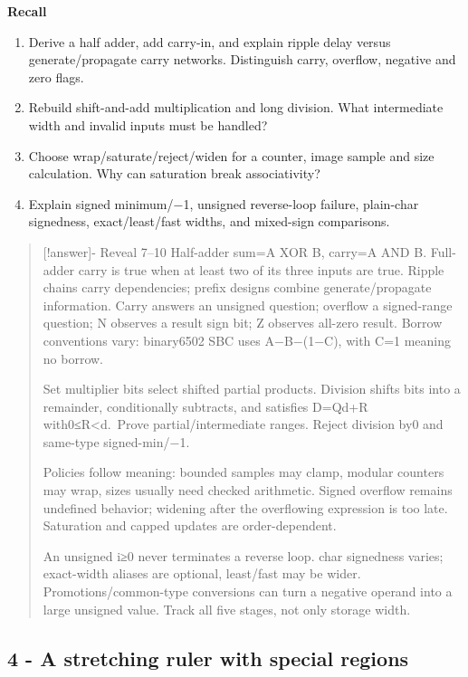 \textbf{Recall}

\begin{enumerate}
\def\labelenumi{\arabic{enumi}.}
\setcounter{enumi}{6}
\tightlist
\item
  Derive a half adder, add carry-in, and explain ripple delay versus generate/propagate carry networks. Distinguish carry, overflow, negative and zero flags.
\item
  Rebuild shift-and-add multiplication and long division. What intermediate width and invalid inputs must be handled?
\item
  Choose wrap/saturate/reject/widen for a counter, image sample and size calculation. Why can saturation break associativity?
\item
  Explain signed minimum/−1, unsigned reverse-loop failure, plain-char signedness, exact/least/fast widths, and mixed-sign comparisons.
\end{enumerate}

\begin{quote}
{[}!answer{]}- Reveal 7--10 Half-adder sum=A XOR B, carry=A AND B. Full-adder carry is true when at least two of its three inputs are true. Ripple chains carry dependencies; prefix designs combine generate/propagate information. Carry answers an unsigned question; overflow a signed-range question; N observes a result sign bit; Z observes all-zero result. Borrow conventions vary: binary6502 SBC uses A−B−(1−C), with C=1 meaning no borrow.

Set multiplier bits select shifted partial products. Division shifts bits into a remainder, conditionally subtracts, and satisfies D=Qd+R with0≤R\textless d.~Prove partial/intermediate ranges. Reject division by0 and same-type signed-min/−1.

Policies follow meaning: bounded samples may clamp, modular counters may wrap, sizes usually need checked arithmetic. Signed overflow remains undefined behavior; widening after the overflowing expression is too late. Saturation and capped updates are order-dependent.

An unsigned i≥0 never terminates a reverse loop. char signedness varies; exact-width aliases are optional, least/fast may be wider. Promotions/common-type conversions can turn a negative operand into a large unsigned value. Track all five stages, not only storage width.
\end{quote}

\subsection{4 - A stretching ruler with special regions}\label{a-stretching-ruler-with-special-regions}

